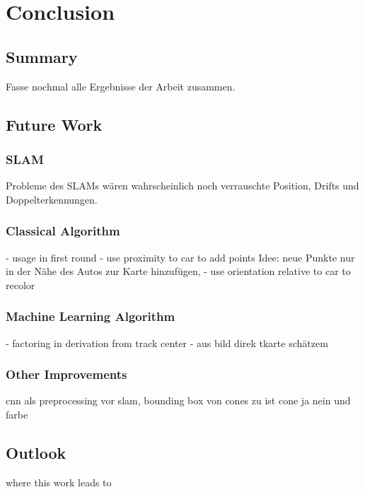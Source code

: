 \chapter{Conclusion}
\label{chap:end}

\section{Summary}
Fasse nochmal alle Ergebnisse der Arbeit zusammen.

\section{Future Work}
\subsection{SLAM}
Probleme des SLAMs wären wahrscheinlich noch verrauschte Position, Drifts und Doppelterkennungen.
\subsection{Classical Algorithm}
- usage in first round
- use proximity to car to add points
Idee: neue Punkte nur in der Nähe des Autos zur Karte hinzufügen,
- use orientation relative to car to recolor
\subsection{Machine Learning Algorithm}
- factoring in derivation from track center
- aus bild direk tkarte schätzem
\subsection{Other Improvements}
cnn als preprocessing vor slam, bounding box von cones zu ist cone ja nein und farbe
\section{Outlook}
where this work leads to
